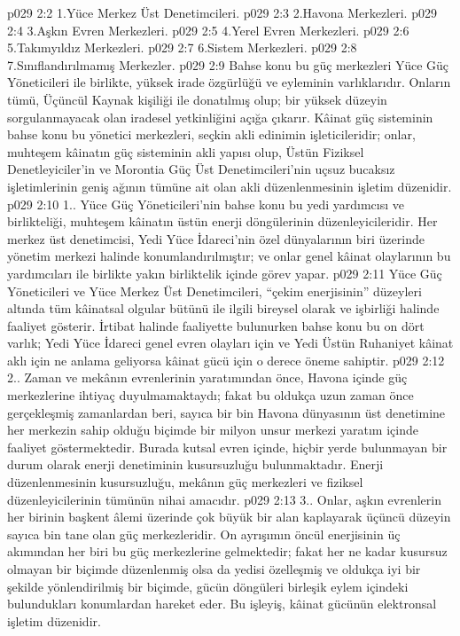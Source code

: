 \vs p029 2:2 1.\bibnobreakspace Yüce Merkez Üst Denetimcileri.
\vs p029 2:3 2.\bibnobreakspace Havona Merkezleri.
\vs p029 2:4 3.\bibnobreakspace Aşkın Evren Merkezleri.
\vs p029 2:5 4.\bibnobreakspace Yerel Evren Merkezleri.
\vs p029 2:6 5.\bibnobreakspace Takımyıldız Merkezleri.
\vs p029 2:7 6.\bibnobreakspace Sistem Merkezleri.
\vs p029 2:8 7.\bibnobreakspace Sınıflandırılmamış Merkezler.
\vs p029 2:9 Bahse konu bu güç merkezleri Yüce Güç Yöneticileri ile birlikte, yüksek irade özgürlüğü ve eyleminin varlıklarıdır. Onların tümü, Üçüncül Kaynak kişiliği ile donatılmış olup; bir yüksek düzeyin sorgulanmayacak olan iradesel yetkinliğini açığa çıkarır. Kâinat güç sisteminin bahse konu bu yönetici merkezleri, seçkin akli edinimin işleticileridir; onlar, muhteşem kâinatın güç sisteminin akli yapısı olup, Üstün Fiziksel Denetleyiciler’in ve Morontia Güç Üst Denetimcileri’nin uçsuz bucaksız işletimlerinin geniş ağının tümüne ait olan akli düzenlenmesinin işletim düzenidir.
\vs p029 2:10 1.\bibnobreakspace {}. Yüce Güç Yöneticileri’nin bahse konu bu yedi yardımcısı ve birlikteliği, muhteşem kâinatın üstün enerji döngülerinin düzenleyicileridir. Her merkez üst denetimcisi, Yedi Yüce İdareci’nin özel dünyalarının biri üzerinde yönetim merkezi halinde konumlandırılmıştır; ve onlar genel kâinat olaylarının bu yardımcıları ile birlikte yakın birliktelik içinde görev yapar.
\vs p029 2:11 Yüce Güç Yöneticileri ve Yüce Merkez Üst Denetimcileri, “çekim enerjisinin” düzeyleri altında tüm kâinatsal olgular bütünü ile ilgili bireysel olarak ve işbirliği halinde faaliyet gösterir. İrtibat halinde faaliyette bulunurken bahse konu bu on dört varlık; Yedi Yüce İdareci genel evren olayları için ve Yedi Üstün Ruhaniyet kâinat aklı için ne anlama geliyorsa kâinat gücü için o derece öneme sahiptir.
\vs p029 2:12 2.\bibnobreakspace {}. Zaman ve mekânın evrenlerinin yaratımından önce, Havona içinde güç merkezlerine ihtiyaç duyulmamaktaydı; fakat bu oldukça uzun zaman önce gerçekleşmiş zamanlardan beri, sayıca bir bin Havona dünyasının üst denetimine her merkezin sahip olduğu biçimde bir milyon unsur merkezi yaratım içinde faaliyet göstermektedir. Burada kutsal evren içinde, hiçbir yerde bulunmayan bir durum olarak enerji denetiminin kusursuzluğu bulunmaktadır. Enerji düzenlenmesinin kusursuzluğu, mekânın güç merkezleri ve fiziksel düzenleyicilerinin tümünün nihai amacıdır.
\vs p029 2:13 3.\bibnobreakspace {}. Onlar, aşkın evrenlerin her birinin başkent âlemi üzerinde çok büyük bir alan kaplayarak üçüncü düzeyin sayıca bin tane olan güç merkezleridir. On ayrışımın öncül enerjisinin üç akımından her biri bu güç merkezlerine gelmektedir; fakat her ne kadar kusursuz olmayan bir biçimde düzenlenmiş olsa da yedisi özelleşmiş ve oldukça iyi bir şekilde yönlendirilmiş bir biçimde, gücün döngüleri birleşik eylem içindeki bulundukları konumlardan hareket eder. Bu işleyiş, kâinat gücünün elektronsal işletim düzenidir.
